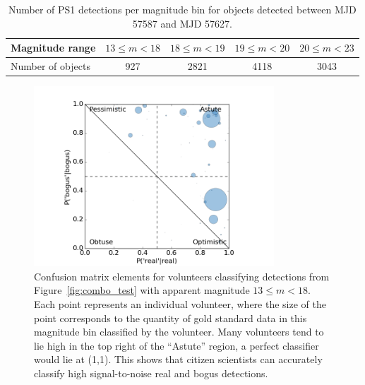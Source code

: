 \documentclass[a4paper,fleqn,usenatbib]{mnras}
\begin{document}
\begin{table}
\begin{minipage}{120mm}
\centering
\begin{tabular}{l|c c c c }
Magnitude range     & $13\leq m < 18$ & $18\leq m < 19$ & $19\leq m < 20$ & $20\leq m < 23$ \\
\hline
Number of objects  & 927 & 2821 & 4118 & 3043 \\
\end{tabular}
\caption{Number of PS1 detections per magnitude bin for objects detected between
            MJD 57587 and MJD 57627.
}\label{tab:mag_bins}
\end{minipage}
\end{table}


\begin{figure}
   \includegraphics[trim=22mm 2mm 20mm 10mm,clip,width=90mm]{figs/users_meta_swap_13-18.png}
   \caption{Confusion matrix elements for volunteers classifying detections from Figure~\ref{fig:combo_test} with apparent magnitude $13\leq m < 18$.  Each point represents an individual volunteer, where the size of the point corresponds to the quantity of gold standard data in this magnitude bin classified by the volunteer.  Many volunteers tend to lie high in the top right of the ``Astute'' region, a perfect classifier would lie at (1,1).  This shows that citizen scientists can accurately classify high signal-to-noise real and bogus detections.}
   \label{fig:13-18} 
\end{figure}
\end{document}
